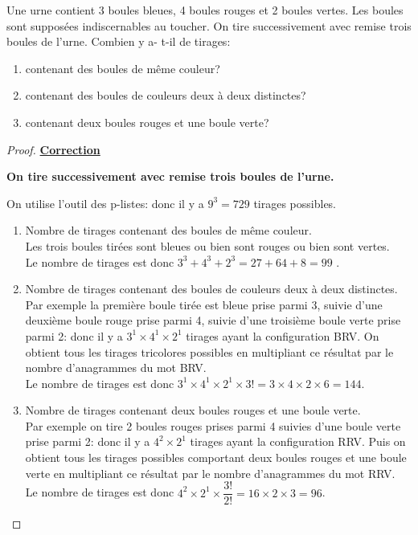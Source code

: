 \begin{exercice}

Une urne contient 3 boules bleues, 4 boules rouges et 2 boules vertes. Les boules sont supposées indiscernables au toucher.
 On tire successivement avec remise trois boules de l'urne.
Combien y a- t-il de tirages:
\begin{enumerate}
\item contenant des boules de même couleur?
\item contenant des boules de couleurs  deux à deux distinctes?
\item  contenant deux boules rouges et une boule verte?
\end{enumerate}
\end{exercice}

\begin{proof}
\textbf{\underline{ Correction}}

 \textbf{On tire successivement avec remise trois boules de l'urne.} 
 
On utilise l'outil des p-listes: donc il y a $ 9^{3}= 729$ tirages possibles.
\begin{enumerate}
\item Nombre de tirages contenant des boules de même couleur.\\
 Les trois boules tirées sont bleues ou bien  sont rouges ou bien  sont vertes.\\
Le nombre de tirages est donc  $ 3^{3}+ 4^{3}+ 2^{3} = 27+64+8=99$ .
\item Nombre de tirages contenant des boules de couleurs deux à deux distinctes.\\
Par exemple la première boule tirée est bleue prise parmi 3, suivie d'une deuxième boule   rouge prise parmi 4, suivie d'une troisième boule verte prise parmi 2: donc il y a $ 3^{1}\times 4^{1}\times 2^{1} $ tirages ayant la  configuration BRV. On obtient tous les tirages  tricolores possibles en multipliant ce résultat par le nombre d'anagrammes du mot BRV. \\
Le nombre de tirages est donc  $ 3^{1}\times 4^{1}\times 2^{1}\times 3!=3\times 4\times 2\times6=144 $. 
\item  Nombre de tirages contenant deux  boules rouges et une boule verte.\\
Par exemple on tire 2 boules rouges prises parmi 4 suivies d'une boule verte prise parmi 2: donc il y a $ 4^{2}\times 2^{1} $ tirages ayant la configuration RRV. Puis on obtient tous les tirages possibles comportant deux  boules rouges et une boule verte  en multipliant ce résultat  par le nombre d'anagrammes du mot RRV.\\
Le nombre de tirages est donc  $ 4^{2}\times 2^{1}\times \dfrac{3!}{2!}=16\times 2\times 3=96 $.
\end{enumerate}
\end{proof}

